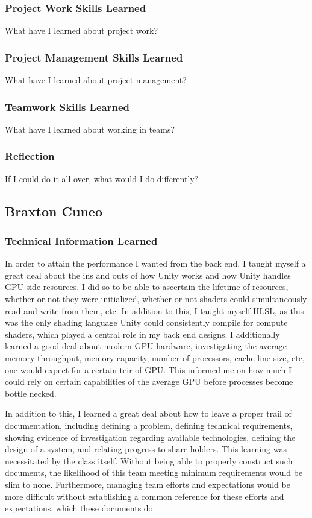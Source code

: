 \documentclass[onecolumn, draftclsnofoot,10pt, compsoc]{IEEEtran}
\begin{document}
\subsubsection{Project Work Skills Learned}
What have I learned about project work?
\subsubsection{Project Management Skills Learned}
What have I learned about project management?
\subsubsection{Teamwork Skills Learned}
What have I learned about working in teams?
\subsubsection{Reflection}
If I could do it all over, what would I do differently?


\subsection{Braxton Cuneo}

\subsubsection{Technical Information Learned}

In order to attain the performance I wanted from the back end, I taught myself a great deal about the ins and outs of how Unity works and how Unity handles GPU-side resources. I did so to be able to ascertain the lifetime of resources, whether or not they were initialized, whether or not shaders could simultaneously read and write from them, etc. In addition to this, I taught myself HLSL, as this was the only shading language Unity could consistently compile for compute shaders, which played a central role in my back end designs. I additionally learned a good deal about modern GPU hardware, investigating the average memory throughput, memory capacity, number of processors, cache line size, etc, one would expect for a certain teir of GPU. This informed me on how much I could rely on certain capabilities of the average GPU before processes become bottle necked.

In addition to this, I learned a great deal about how to leave a proper trail of documentation, including defining a problem, defining technical requirements, showing evidence of investigation regarding available technologies, defining the design of a system, and relating progress to share holders. This learning was necessitated by the class itself. Without being able to properly construct such documents, the likelihood of this team meeting minimum requirements would be slim to none. Furthermore, managing team efforts and expectations would be more difficult without establishing a common reference for these efforts and expectations, which these documents do.
\end{document}

